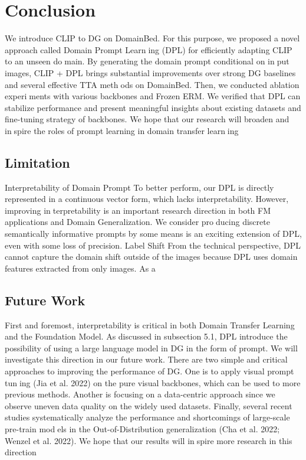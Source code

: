 \documentclass{article}
\begin{document}
\section{Conclusion}
We introduce CLIP to DG on DomainBed. For this purpose,
we proposed a novel approach called Domain Prompt Learning (DPL) for efficiently adapting CLIP to an unseen domain. By generating the domain prompt conditional on input images, CLIP + DPL brings substantial improvements
over strong DG baselines and several effective TTA methods on DomainBed. Then, we conducted ablation experiments with various backbones and Frozen ERM. We verified
that DPL can stabilize performance and present meaningful
insights about existing datasets and fine-tuning strategy of
backbones. We hope that our research will broaden and inspire the roles of prompt learning in domain transfer learning

\subsection{Limitation}


Interpretability of Domain Prompt To better perform,
our DPL is directly represented in a continuous vector
form, which lacks interpretability. However, improving interpretability is an important research direction in both FM
applications and Domain Generalization. We consider producing discrete semantically informative prompts by some
means is an exciting extension of DPL, even with some loss
of precision.
Label Shift From the technical perspective, DPL cannot
capture the domain shift outside of the images because
DPL uses domain features extracted from only images. As a

\subsection{Future Work}
First and foremost, interpretability is critical in both Domain
Transfer Learning and the Foundation Model. As discussed
in subsection 5.1, DPL introduce the possibility of using a
large language model in DG in the form of prompt. We will
investigate this direction in our future work.
There are two simple and critical approaches to improving
the performance of DG. One is to apply visual prompt tuning (Jia et al. 2022) on the pure visual backbones, which can
be used to more previous methods. Another is focusing on a
data-centric approach since we observe uneven data quality
on the widely used datasets.
Finally, several recent studies systematically analyze the
performance and shortcomings of large-scale pre-train models in the Out-of-Distribution generalization (Cha et al.
2022; Wenzel et al. 2022). We hope that our results will inspire more research in this direction
\end{document}
